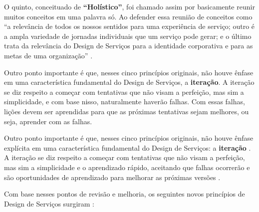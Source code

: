 O quinto, conceituado de \textbf{``Holístico''}, foi chamado assim por basicamente reunir muitos conceitos em uma palavra só. Ao defender essa reunião de conceitos como ``a relevância de todos os nossos sentidos para uma experiência de serviço; outro é a ampla variedade de jornadas individuais que um serviço pode gerar; e o último trata da relevância do Design de Serviços para a identidade corporativa e para as metas de uma organização'' \cite{Stickdorn2019}.

Outro ponto importante é que, nesses cinco princípios originais, não houve ênfase em uma característica fundamental do Design de Serviços, a \textbf{iteração}. A iteração se diz respeito a começar com tentativas que não visam a perfeição, mas sim a simplicidade, e com base nisso, naturalmente haverão falhas. Com essas falhas, lições devem ser aprendidas para que as próximas tentativas sejam melhores, ou seja, aprender com as falhas.

Outro ponto importante é que, nesses cinco princípios originais, não houve ênfase explícita em uma característica fundamental do Design de Serviços: a \textbf{iteração} \cite{Stickdorn2019}. A iteração se diz respeito a começar com tentativas que não visam a perfeição, mas sim a simplicidade e o aprendizado rápido, aceitando que falhas ocorrerão e são oportunidades de aprendizado para melhorar as próximas versões \cite{kumar2023rheumatology}.

Com base nesses pontos de revisão e melhoria, os seguintes novos princípios de Design de Serviços surgiram \cite{Stickdorn2019}:

